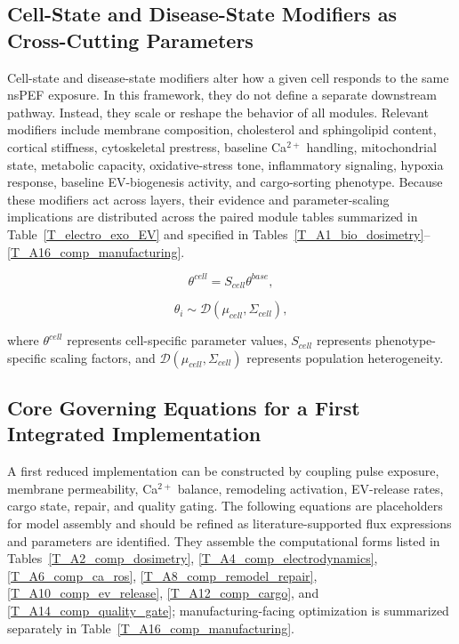 \subsection*{Cell-State and Disease-State Modifiers as Cross-Cutting Parameters}

Cell-state and disease-state modifiers alter how a given cell responds to the same nsPEF exposure. In this framework, they do not define a separate downstream pathway. Instead, they scale or reshape the behavior of all modules. Relevant modifiers include membrane composition, cholesterol and sphingolipid content, cortical stiffness, cytoskeletal prestress, baseline Ca$^{2+}$ handling, mitochondrial state, metabolic capacity, oxidative-stress tone, inflammatory signaling, hypoxia response, baseline EV-biogenesis activity, and cargo-sorting phenotype. Because these modifiers act across layers, their evidence and parameter-scaling implications are distributed across the paired module tables summarized in Table~\ref{T_electro_exo_EV} and specified in Tables~\ref{T_A1_bio_dosimetry}--\ref{T_A16_comp_manufacturing}.

\begin{equation}
\theta^{cell}=S_{cell}\theta^{base},
\end{equation}

\begin{equation}
\theta_i\sim \mathcal{D}(\mu_{cell},\Sigma_{cell}),
\end{equation}

where $\theta^{cell}$ represents cell-specific parameter values, $S_{cell}$ represents phenotype-specific scaling factors, and $\mathcal{D}(\mu_{cell},\Sigma_{cell})$ represents population heterogeneity.

\subsection*{Core Governing Equations for a First Integrated Implementation}

A first reduced implementation can be constructed by coupling pulse exposure, membrane permeability, Ca$^{2+}$ balance, remodeling activation, EV-release rates, cargo state, repair, and quality gating. The following equations are placeholders for model assembly and should be refined as literature-supported flux expressions and parameters are identified. They assemble the computational forms listed in Tables~\ref{T_A2_comp_dosimetry}, \ref{T_A4_comp_electrodynamics}, \ref{T_A6_comp_ca_ros}, \ref{T_A8_comp_remodel_repair}, \ref{T_A10_comp_ev_release}, \ref{T_A12_comp_cargo}, and \ref{T_A14_comp_quality_gate}; manufacturing-facing optimization is summarized separately in Table~\ref{T_A16_comp_manufacturing}.

